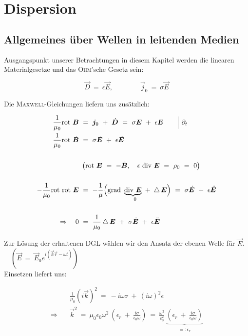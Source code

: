 \chapter{Dispersion}

\section{Allgemeines über Wellen in leitenden Medien}

Ausgangspunkt unserer Betrachtungen in diesem Kapitel werden die linearen Materialgesetze und das \textsc{Ohm}'sche Gesetz sein:

\begin{equation*}
\vec{D}  \ = \ \epsilon \vec{E}, \qquad\qquad\vec{j}_0  \ = \ \sigma\vec{E}
\end{equation*}

Die \textsc{Maxwell}-Gleichungen liefern uns zusätzlich:

\begin{align*}
\frac{1}{\mu_0}\rot\vec{B}  \ &= \  \vec{j}_0 \ + \ \dot{\vec{D}}  \ = \ \sigma\vec{E} \ + \ \epsilon\vec{E} \qquad\Big| \ \partial_t\\
\frac{1}{\mu_0}\rot\dot{\vec{B}} \ &= \ \sigma\dot{\vec{E}} \ + \ \epsilon\ddot{\vec{E}}\\
\ \\
&\left(\rot\vec{E} \ = \ -\dot{\vec{B}}, \quad \epsilon \ \div\vec{E} \ = \ \rho_0  \ = \ 0\right)\\
\ \\
-\frac{1}{\mu_0} \rot\rot \vec{E}  \ &= \ - \frac{1}{\mu}\Big(\grad\underbrace{\div\vec{E}}_{=0} \ + \ \laplace\vec{E}\Big)  \ = \ \sigma\dot{\vec{E}} \ + \ \epsilon\ddot{\vec{E}}\\
\ \\
\Rightarrow \quad 0  \ &= \ \frac{1}{\mu_0}\laplace\vec{E} \ + \ \sigma\dot{\vec{E}}\ + \ \epsilon\ddot{\vec{E}} 
\end{align*}

Zur Lösung der erhaltenen DGL wählen wir den Ansatz der ebenen Welle für $\vec{E}$. $\quad(\vec{E} \ = \ \vec{E}_0 e^{i(\vec{k}\vec{r}-\omega t)})$\\
\newpage
Einsetzen liefert uns:

\begin{align*}
&\frac{1}{\mu_0} \left(i\vec{k}\right)^2  \ = \ -i \omega \sigma \ + \  \left(i\omega\right)^2\epsilon\\
\Rightarrow\quad &\vec{k}^2 \ = \ \mu_0\epsilon_0\omega^2 \ \left(\epsilon_r \ + \ \frac{i\sigma}{\epsilon_0\omega}\right) \ = \ \frac{\omega^2}{c_0^2} \ \underbrace{\left(\epsilon_r \ + \ \frac{i\sigma}{\epsilon_0 \omega}\right)}_{=:\tilde{\epsilon}_r}
\end{align*}


